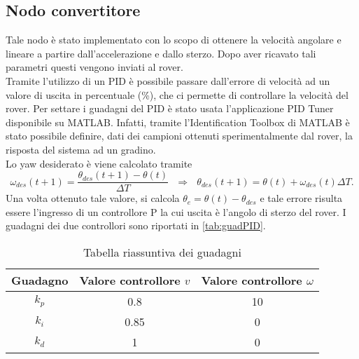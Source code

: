 \subsection{Nodo convertitore}
Tale nodo è stato implementato con lo scopo di ottenere la velocità angolare e lineare a partire dall'accelerazione e dallo sterzo. Dopo aver ricavato tali parametri questi vengono inviati al rover.\\
Tramite l'utilizzo di un PID è possibile passare dall'errore di velocità ad un valore di uscita in percentuale (\%), che ci permette di controllare la velocità del rover. Per settare i guadagni del PID è stato usata l'applicazione PID Tuner disponibile su MATLAB. Infatti, tramite l'Identification Toolbox di MATLAB è stato possibile definire, dati dei campioni ottenuti sperimentalmente dal rover, la risposta del sistema ad un gradino.\\
Lo yaw desiderato è viene calcolato tramite
\begin{equation}
\omega_{des}(t+1)=\frac{\theta_{des}(t+1)-\theta(t)}{\Delta{T}} \ \ \
\Rightarrow \ \ \ \theta_{des}(t+1)=\theta(t)+\omega_{des}(t)\Delta{T}.
\end{equation} 
Una volta ottenuto tale valore, si calcola $ \theta_e = \theta(t) - \theta_{des} $ e tale errore risulta essere l'ingresso di un controllore P la cui uscita è l'angolo di sterzo del rover.
I guadagni dei due controllori sono riportati in \autoref{tab:guadPID}.
\begin{table} [H]
    \centering
    \begin{tabular}{|ccc|}
    \hline
        Guadagno & Valore controllore $v$ & Valore controllore $\omega$ \\  \hline
        $k_p$ & 0.8  & 10\\  \hline
        $k_i$ & 0.85 & 0 \\  \hline
        $k_d$ & 1    & 0 \\  \hline
    \end{tabular}
    \caption{Tabella riassuntiva dei guadagni}
    \label{tab:guadPID}    
\end{table}



